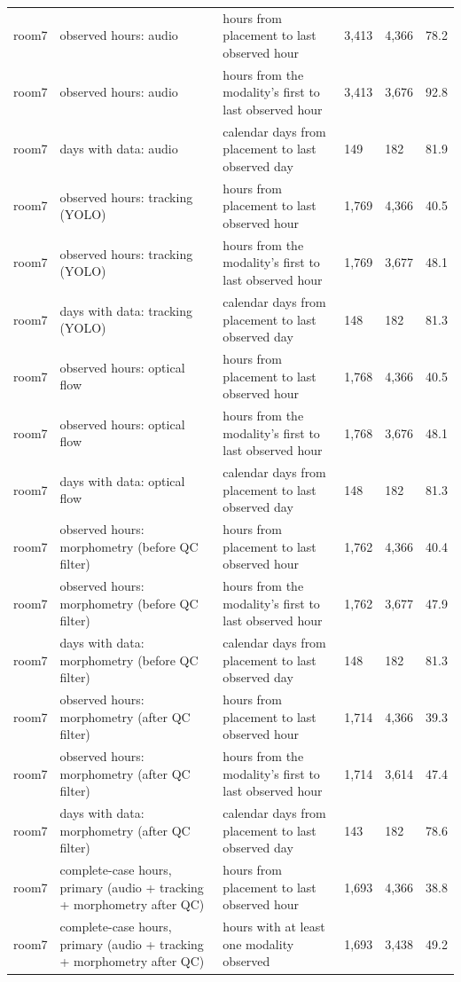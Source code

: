 \begin{tabular}{llllll}
room7 & observed hours: audio & hours from placement to last observed hour & 3,413 & 4,366 & 78.2 \\
room7 & observed hours: audio & hours from the modality's first to last observed hour & 3,413 & 3,676 & 92.8 \\
room7 & days with data: audio & calendar days from placement to last observed day & 149 & 182 & 81.9 \\
room7 & observed hours: tracking (YOLO) & hours from placement to last observed hour & 1,769 & 4,366 & 40.5 \\
room7 & observed hours: tracking (YOLO) & hours from the modality's first to last observed hour & 1,769 & 3,677 & 48.1 \\
room7 & days with data: tracking (YOLO) & calendar days from placement to last observed day & 148 & 182 & 81.3 \\
room7 & observed hours: optical flow & hours from placement to last observed hour & 1,768 & 4,366 & 40.5 \\
room7 & observed hours: optical flow & hours from the modality's first to last observed hour & 1,768 & 3,676 & 48.1 \\
room7 & days with data: optical flow & calendar days from placement to last observed day & 148 & 182 & 81.3 \\
room7 & observed hours: morphometry (before QC filter) & hours from placement to last observed hour & 1,762 & 4,366 & 40.4 \\
room7 & observed hours: morphometry (before QC filter) & hours from the modality's first to last observed hour & 1,762 & 3,677 & 47.9 \\
room7 & days with data: morphometry (before QC filter) & calendar days from placement to last observed day & 148 & 182 & 81.3 \\
room7 & observed hours: morphometry (after QC filter) & hours from placement to last observed hour & 1,714 & 4,366 & 39.3 \\
room7 & observed hours: morphometry (after QC filter) & hours from the modality's first to last observed hour & 1,714 & 3,614 & 47.4 \\
room7 & days with data: morphometry (after QC filter) & calendar days from placement to last observed day & 143 & 182 & 78.6 \\
room7 & complete-case hours, primary (audio + tracking + morphometry after QC) & hours from placement to last observed hour & 1,693 & 4,366 & 38.8 \\
room7 & complete-case hours, primary (audio + tracking + morphometry after QC) & hours with at least one modality observed & 1,693 & 3,438 & 49.2 \\

\end{tabular}
